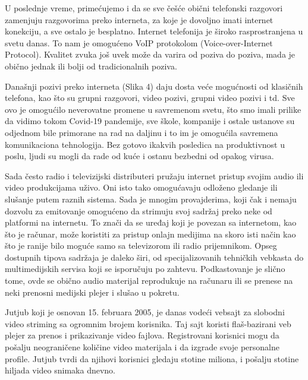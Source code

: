 \documentclass[10pt]{article}
\begin{document}
	U poslednje vreme, primećujemo i da se sve češće obični telefonski razgovori zamenjuju razgovorima preko interneta, za koje je dovoljno imati internet konekciju, a sve ostalo je besplatno. Internet telefonija je široko rasprostranjena u svetu danas. To nam je omogućeno VoIP protokolom (Voice-over-Internet Protocol). Kvalitet zvuka još uvek može da varira od poziva do poziva, mada je obično jednak ili bolji od tradicionalnih poziva.
	
    Današnji pozivi preko interneta (Slika 4) daju dosta veće mogućnosti od klasičnih telefona, kao što su grupni razgovori, video pozivi, grupni video pozivi i td. Sve ovo je omogućilo neverovatne promene u savremenom svetu, što smo imali prilike da vidimo tokom Covid-19 pandemije, sve škole, kompanije i ostale ustanove su odjednom bile primorane na rad na daljinu i to im je omogućila savremena komunikaciona tehnologija. Bez gotovo ikakvih posledica na produktivnost u poslu, ljudi su mogli da rade od kuće i ostanu bezbedni od opakog virusa. 

    Sada često radio i televizijski distributeri pružaju internet pristup svojim audio ili video produkcijama uživo. Oni isto tako omogućavaju odloženo gledanje ili slušanje putem raznih sistema. Sada je mnogim provajderima, koji čak i nemaju dozvolu za emitovanje omogućeno da strimuju svoj sadržaj preko neke od platformi na internetu. To znači da se uređaj koji je povezan sa internetom, kao što je računar, može koristiti za pristup onlajn medijima na skoro isti način kao što je ranije bilo moguće samo sa televizorom ili radio prijemnikom. Opseg dostupnih tipova sadržaja je daleko širi, od specijalizovanih tehničkih vebkasta do multimedijskih servisa koji se isporučuju po zahtevu. Podkastovanje je slično tome, ovde se obično audio materijal reprodukuje na računaru ili se prenese na neki prenosni medijski plejer i slušao u pokretu. 
    
	Jutjub koji je osnovan 15. februara 2005, je danas vodeći vebsajt za slobodni video striming sa ogromnim brojem korisnika. Taj sajt koristi flaš-bazirani veb plejer za prenos i prikazivanje video fajlova. Registrovani korisnici mogu da pošalju neograničene količine video materijala i da izgrade svoje personalne profile. Jutjub tvrdi da njihovi korisnici gledaju stotine miliona, i pošalju stotine hiljada video snimaka dnevno.
\end{document}
